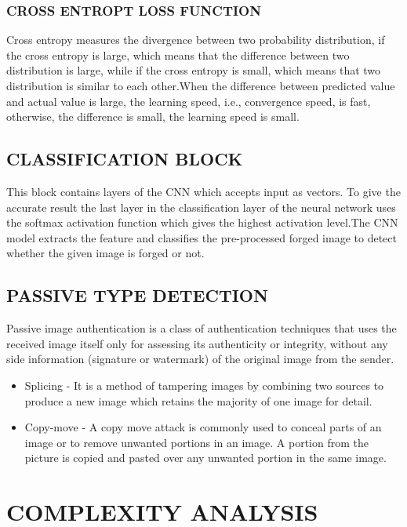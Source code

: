 \subsubsection{CROSS ENTROPT LOSS FUNCTION}
Cross entropy measures the divergence between two probability distribution, if the cross entropy is large, which means that the difference between two distribution is large, while if the cross entropy is small, which means that two distribution is similar to each other.When the difference between predicted value and actual value is large, the learning speed, i.e., convergence speed, is fast, otherwise, the difference is small, the learning speed is small.  

\subsection{CLASSIFICATION BLOCK}
This block contains layers of the CNN which accepts input as vectors.
To give the accurate result the last layer in the classification
layer of the neural network uses the softmax activation function which gives the highest activation level.The CNN model extracts the feature and classifies the pre-processed forged image to detect whether the given image is forged or not.

\subsection{PASSIVE TYPE DETECTION}
Passive image authentication is a class of authentication techniques that uses the received image itself only for assessing its authenticity or integrity, without any side information (signature or watermark) of the original image from the sender.
\begin{itemize}
    \item Splicing - It is a method of tampering images by combining two sources to produce a new image which retains the majority of one image for detail. 
    \item Copy-move - A copy move attack is commonly used to conceal parts of an image or to remove unwanted portions in an image. A portion from the picture is copied and pasted over any unwanted portion in the same image.
    \end{itemize}
    

\section{COMPLEXITY ANALYSIS}
